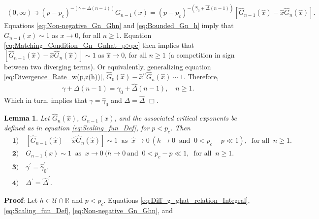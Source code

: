 \documentclass[english,12pt,jmp,graphicx]{revtex4-1}
\newtheorem{lemma}{Lemma}[section]
\newcommand{\ph}{\hat{\phi}}
\newcommand{\gh}{\hat{\gamma}}
\newcommand{\Dh}{\hat{\Delta}}
\newcommand{\xh}{\hat{x}}
\begin{document}
%
\begin{align}\label{eq:Matching_Condition_Gn_Gnhat_p>pc}
  (0,\infty)\ni(p-p_c)^{-(\gamma+\Delta(n-1))}G_{n-1}(x)
       =(p-p_c)^{-(\gh_0+\Dh(n-1))}[\hat{G}_{n-1}(\xh)-\xh\hat{G}_n(\xh)].
\end{align}
%
Equations \eqref{eq:Non-negative_Gn_Ghn} and \eqref{eq:Bounded_Gn_h}
imply that $G_{n-1}(x)\sim1$ as $x\to0$, for all $n\geq1$. Equation
\eqref{eq:Matching_Condition_Gn_Gnhat_p>pc} then implies that 
$[\hat{G}_{n-1}(\xh)-\xh\hat{G}_n(\xh)]\sim1$ as $\xh\to0$,
for all $n\geq1$ (a competition in sign between two diverging
terms). Or equivalently, generalizing
equation \eqref{eq:Divergence_Rate_w(p,z(h))},
$\hat{G}_0(\xh)-\xh^n\hat{G}_n(\xh)\sim1$. Therefore,   
%
\begin{align}
  \gamma+\Delta(n-1)=\gh_0+\Dh(n-1), \quad n\geq1.
\end{align}
%
Which in turn, implies that $\gamma=\gh_0$ and $\Delta=\Dh$ $\Box$.
%
%
 \begin{lemma}\label{lem:asymp_Scaling_funs_x_to_0_p<pc}
   Let $\hat{G}_n(\xh)$, $G_{n-1}(x)$, and the associated critical
   exponents be defined as in equation \eqref{eq:Scaling_fun_Def}, for
   $p<p_c$. Then
     \begin{align*}
    &\mathbf{1)}\quad [\hat{G}_{n-1}(\xh)-\xh\hat{G}_n(\xh)]\sim1 \ \text{ as } \ \xh\to0 \ (h\to0
    \ \text{ and } \ 0<p_c-p\ll1), \ \text{ for all } \ n\geq1. \\
    &\mathbf{2)}\quad G_{n-1}(x)\sim1 \ \text{ as } \ x\to0 \ (h\to0 \ \text{
      and } \ 0<p_c-p\ll1, \ \text{ for all } \ n\geq1.\\
    &\mathbf{3)}\quad \gamma^\prime=\gh_0^\prime.  \\%
    &\mathbf{4)}\quad \Delta^\prime=\Dh^\prime.   
     \end{align*}
 \end{lemma}
%
\noindent \textbf{Proof}:
%
Let $h\in\mathcal{U}\cap\mathbb{R}$ and $p<p_c$.
Equations \eqref{eq:Diff_g_ghat_relation_Integral}, 
\eqref{eq:Scaling_fun_Def}, \eqref{eq:Non-negative_Gn_Ghn}, and
\end{document}
